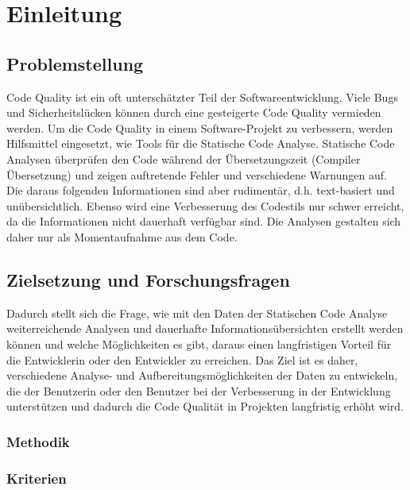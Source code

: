 \chapter{Einleitung}

\section{Problemstellung}
Code Quality ist ein oft unterschätzter Teil der Softwareentwicklung. Viele Bugs und Sicherheitslücken können durch eine gesteigerte Code Quality vermieden werden. Um die Code Quality in einem Software-Projekt zu verbessern, werden Hilfsmittel eingesetzt, wie Tools für die Statische Code Analyse. Statische Code Analysen überprüfen den Code während der Übersetzungszeit (Compiler Übersetzung) und zeigen auftretende Fehler und verschiedene Warnungen auf. Die daraus folgenden Informationen sind aber rudimentär, d.h. text-basiert und unübersichtlich. Ebenso wird eine Verbesserung des Codestils nur schwer erreicht, da die Informationen nicht dauerhaft verfügbar sind. Die Analysen gestalten sich daher nur als Momentaufnahme aus dem Code. 

\section{Zielsetzung und Forschungsfragen}

Dadurch stellt sich die Frage, wie mit den Daten der Statischen Code Analyse weiterreichende Analysen und dauerhafte Informationsübersichten erstellt werden können und welche Möglichkeiten es gibt, daraus einen langfristigen Vorteil für die Entwicklerin oder den Entwickler zu erreichen. Das Ziel ist es daher, verschiedene Analyse- und Aufbereitungsmöglichkeiten der Daten zu entwickeln, die der Benutzerin oder den Benutzer bei der Verbesserung in der Entwicklung unterstützen und dadurch die Code Qualität in Projekten langfristig erhöht wird.

\subsection{Methodik} 



\subsection{Kriterien} 